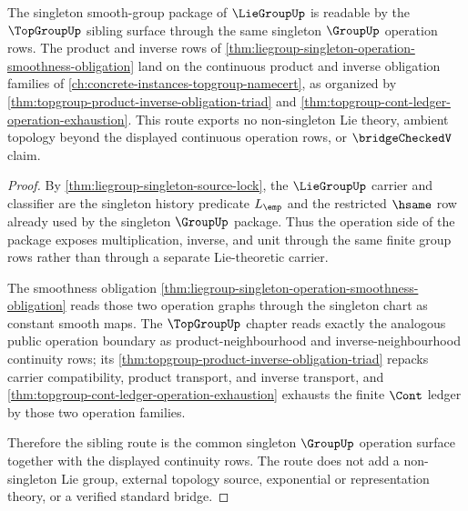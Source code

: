\begin{theorem}
\label{thm:liegroup-singleton-topgroup-sibling-route}
The singleton smooth-group package of $\LieGroupUp$ is readable by the
$\TopGroupUp$ sibling surface through the same singleton $\GroupUp$ operation
rows. The product and inverse rows of
\autoref{thm:liegroup-singleton-operation-smoothness-obligation} land on the
continuous product and inverse obligation families of
\autoref{ch:concrete-instances-topgroup-namecert}, as organized by
\autoref{thm:topgroup-product-inverse-obligation-triad} and
\autoref{thm:topgroup-cont-ledger-operation-exhaustion}. This route exports no
non-singleton Lie theory, ambient topology beyond the displayed continuous
operation rows, or $\bridgeCheckedV$ claim.
\end{theorem}
\begin{proof}
By \autoref{thm:liegroup-singleton-source-lock}, the $\LieGroupUp$ carrier and
classifier are the singleton history predicate $L_{\emp}$ and the restricted
$\hsame$ row already used by the singleton $\GroupUp$ package. Thus the
operation side of the package exposes multiplication, inverse, and unit through
the same finite group rows rather than through a separate Lie-theoretic carrier.

The smoothness obligation
\autoref{thm:liegroup-singleton-operation-smoothness-obligation} reads those
two operation graphs through the singleton chart as constant smooth maps. The
$\TopGroupUp$ chapter reads exactly the analogous public operation boundary as
product-neighbourhood and inverse-neighbourhood continuity rows; its
\autoref{thm:topgroup-product-inverse-obligation-triad} repacks carrier
compatibility, product transport, and inverse transport, and
\autoref{thm:topgroup-cont-ledger-operation-exhaustion} exhausts the finite
$\Cont$ ledger by those two operation families.

Therefore the sibling route is the common singleton $\GroupUp$ operation
surface together with the displayed continuity rows. The route does not add a
non-singleton Lie group, external topology source, exponential or
representation theory, or a verified standard bridge.
\end{proof}
